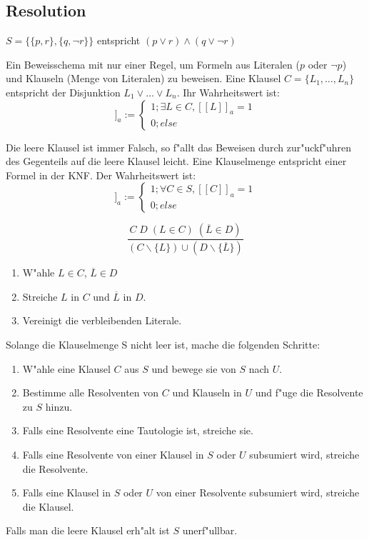 \documentclass[11pt, a4paper,twocolumn]{scrartcl}
\begin{document}
\subsection{Resolution}

$S=\{\{p,r\},\{q,\lnot r\}\}$ entspricht $(p \lor r)\land(q \lor \lnot r)$

Ein Beweisschema mit nur einer Regel, um Formeln aus Literalen ($p$ oder $\lnot p$) und Klauseln (Menge von Literalen) zu beweisen. Eine Klausel $C = \{L_1, \ldots, L_n\}$ entspricht der Disjunktion $L_1 \lor \ldots \lor L_n$. Ihr Wahrheitswert ist:
 \begin{displaymath}
  [[C]]_a := \left\{\begin{array}{l}1;
  \exists L \in C, [[L]]_a = 1\\0; else\end{array}\right.
 \end{displaymath}

Die leere Klausel ist immer Falsch, so f"allt das Beweisen durch zur"uckf"uhren des Gegenteils auf die leere Klausel leicht. Eine Klauselmenge
entspricht einer Formel in der KNF. Der Wahrheitswert ist:
 \begin{displaymath}
  [[S]]_a := \left\{\begin{array}{l}1; \forall C \in S, [[C]]_a = 1\\0; else\end{array}\right.
 \end{displaymath}
																	  
\begin{displaymath}
 \frac{C \; D \; (L \in C) \; (\overline{L} \in D)}{(C \backslash \{L\}) \cup (D \backslash \{\overline{L}\})}
\end{displaymath}

\begin{enumerate}
 \item W"ahle $L \in C$, $\overline{L} \in D$
 \item Streiche $L$ in $C$ und $\overline{L}$ in $D$.
 \item Vereinigt die verbleibenden Literale.
\end{enumerate}

Solange die Klauselmenge S nicht leer ist, mache die folgenden Schritte:

 \begin{enumerate}
  \item W"ahle eine Klausel $C$ aus $S$ und bewege sie von $S$ nach $U$.
  \item Bestimme alle Resolventen von $C$ und Klauseln in $U$ und f"uge die Resolvente zu $S$ hinzu.
  \item Falls eine Resolvente eine Tautologie ist, streiche sie.
  \item Falls eine Resolvente von einer Klausel in $S$ oder $U$ subsumiert wird, streiche die Resolvente.
  \item Falls eine Klausel in $S$ oder $U$ von einer Resolvente subsumiert wird, streiche die Klausel.
 \end{enumerate}
Falls man die leere Klausel erh"alt ist $S$ unerf"ullbar.
\end{document}
